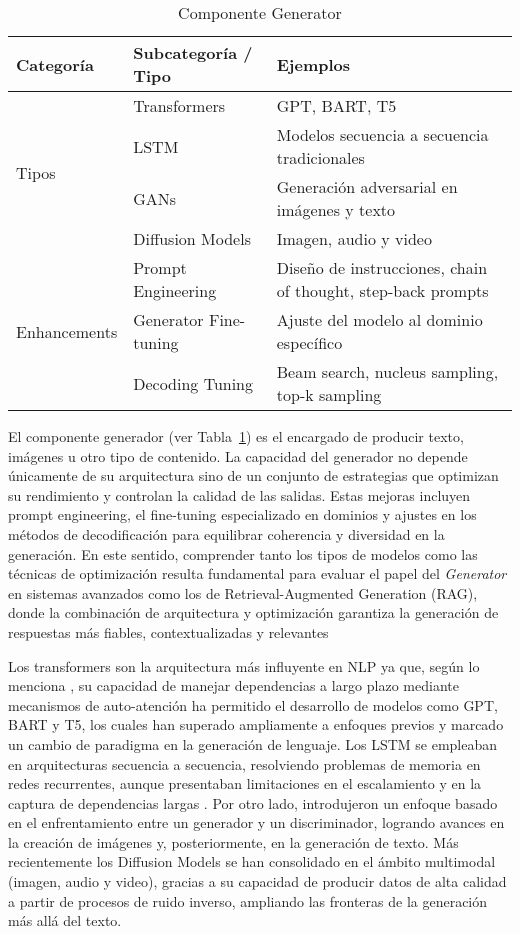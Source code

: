\begin{table}[h]
\centering
\begin{tabularx}{\textwidth}{l l X}
\toprule
\textbf{Categoría} & \textbf{Subcategoría / Tipo} & \textbf{Ejemplos} \\ \midrule
\multirow{4}{*}{Tipos} 
  & Transformers      & GPT, BART, T5 \\
  & LSTM              & Modelos secuencia a secuencia tradicionales \\
  & GANs              & Generación adversarial en imágenes y texto \\
  & Diffusion Models  & Imagen, audio y video \\ \midrule
\multirow{3}{*}{Enhancements}
  & Prompt Engineering   & Diseño de instrucciones, chain of thought, step-back prompts \\
  & Generator Fine-tuning& Ajuste del modelo al dominio específico \\
  & Decoding Tuning      & Beam search, nucleus sampling, top-k sampling \\ \bottomrule
\end{tabularx}
\caption{Componente Generator}
\label{tab:generator}
\end{table}

El componente generador (ver Tabla~\ref{tab:generator}) es el encargado de producir texto, imágenes u otro tipo de contenido. La capacidad del generador no depende únicamente de su arquitectura sino de un conjunto 
de estrategias que optimizan su rendimiento y controlan la calidad de las salidas. Estas mejoras incluyen prompt engineering, el fine-tuning especializado en dominios y 
ajustes en los métodos de decodificación para equilibrar coherencia y diversidad en la generación. En este sentido, comprender tanto los tipos de modelos como las técnicas de optimización resulta fundamental para evaluar el papel del \textit{Generator} 
en sistemas avanzados como los de Retrieval-Augmented Generation (RAG), donde la combinación de arquitectura y optimización garantiza la generación de respuestas 
más fiables, contextualizadas y relevantes 
\parencite{casola2022pretrained,fan2024ragllm,zhang2025hallucination}

Los transformers son la arquitectura más influyente en NLP ya que, según lo menciona \textcite{casola2022pretrained}, su capacidad de manejar dependencias a largo plazo 
mediante mecanismos de auto-atención ha permitido el desarrollo de modelos como GPT, BART y T5, los cuales han superado ampliamente a enfoques previos y marcado un cambio 
de paradigma en la generación de lenguaje. Los LSTM se empleaban en arquitecturas secuencia a secuencia, resolviendo problemas de memoria en redes recurrentes, 
aunque presentaban limitaciones en el escalamiento y en la captura de dependencias largas \parencite{jing2024vecdb}. Por otro lado, introdujeron un enfoque basado 
en el enfrentamiento entre un generador y un discriminador, logrando avances en la creación de imágenes y, posteriormente, en la generación de texto. Más recientemente los Diffusion Models
se han consolidado en el ámbito multimodal (imagen, audio y video), gracias a su capacidad de producir datos de alta calidad a partir de procesos de ruido inverso,
ampliando las fronteras de la generación más allá del texto. 

